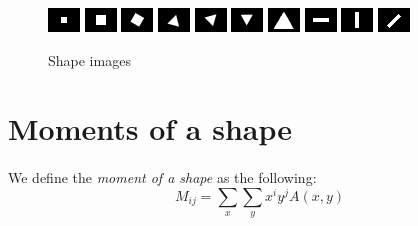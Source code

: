 \begin{figure}[h]
    \centering
    \includegraphics[scale=2.0]{rdf-carre-6.png}
    \includegraphics[scale=2.0]{rdf-carre-10.png}
    \includegraphics[scale=2.0]{rdf-carre-10-30deg.png}
    \includegraphics[scale=2.0]{rdf-triangle-10-15deg.png}
    \includegraphics[scale=2.0]{rdf-triangle-10-45deg.png}
    \includegraphics[scale=2.0]{rdf-triangle-10-60deg.png}
    \includegraphics[scale=2.0]{rdf-triangle-20.png}
    \includegraphics[scale=2.0]{rdf-rectangle-horizontal.png}
    \includegraphics[scale=2.0]{rdf-rectangle-vertical.png}
    \includegraphics[scale=2.0]{rdf-rectangle-diagonal.png}
    \caption{Shape images}
    \label{fig:gray-images}
\end{figure}

\clearpage

\section{Moments of a shape}
\paragraph{}
We define the \emph{moment of a shape} as the following:
$$M_{ij} = \sum_{x}\sum_{y} x^{i} y^{j} A(x, y)$$
